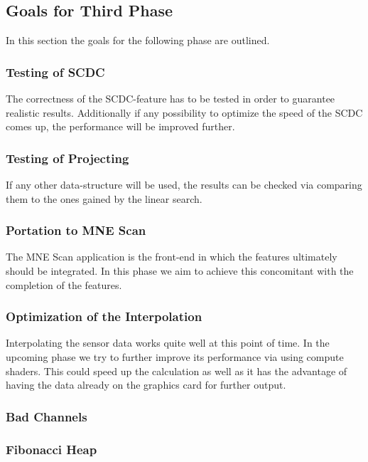 \subsection{Goals for Third Phase}
In this section the goals for the following phase are outlined. 

\subsubsection{Testing of SCDC}
The correctness of the SCDC-feature has to be tested in order to guarantee realistic results. Additionally if any possibility to optimize the speed of the SCDC comes up, the performance will be improved further.
\subsubsection{Testing of Projecting}
If any other data-structure will be used, the results can be checked via comparing them to the ones gained by the linear search.
\subsubsection{Portation to MNE Scan}
The MNE Scan application is the front-end in which the features ultimately should be integrated. In this phase we aim to achieve this concomitant with the completion of the features.
\subsubsection{Optimization of the Interpolation}
Interpolating the sensor data works quite well at this point of time. In the upcoming phase we try to further improve its performance via using compute shaders. This could speed up the calculation as well as it has the advantage of having the data already on the graphics card for further output.
\subsubsection{Bad Channels}
\subsubsection{Fibonacci Heap}